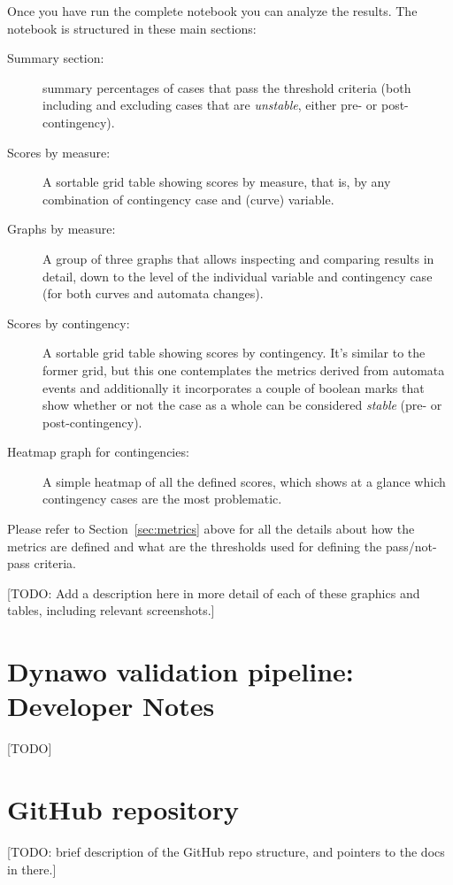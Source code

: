 \documentclass[11pt, a4paper, twoside, titlepage]{article}
\begin{document}
Once you have run the complete notebook you can analyze the
results. The notebook is structured in these main sections:
\begin{description}
\item[Summary section:] summary percentages of cases that pass the
  threshold criteria (both including and excluding cases that are
  \emph{unstable}, either pre- or post-contingency).
\item[Scores by measure:] A sortable grid table showing scores by
  measure, that is, by any combination of contingency case and
  (curve) variable.
\item[Graphs by measure:] A group of three graphs that allows
  inspecting and comparing results in detail, down to the level of the
  individual variable and contingency case (for both curves and
  automata changes).
\item[Scores by contingency:] A sortable grid table showing scores by
  contingency. It's similar to the former grid, but this one
  contemplates the metrics derived from automata events and
  additionally it incorporates a couple of boolean marks that show
  whether or not the case as a whole can be considered \emph{stable}
  (pre- or post-contingency).
\item[Heatmap graph for contingencies:] A simple heatmap of all the
  defined scores, which shows at a glance which contingency cases are
  the most problematic.
\end{description}
Please refer to Section~\ref{sec:metrics} above for all the details
about how the metrics are defined and what are the thresholds used for
defining the pass/not-pass criteria.


[TODO: Add a description here in more detail of each of these graphics
  and tables, including relevant screenshots.]






\section{Dynawo validation pipeline: Developer Notes}
\label{sec:devnotes}
[TODO]







\appendix
\section{GitHub repository}
\label{app:github}
[TODO: brief description of the GitHub repo structure, and pointers to the docs in there.]
      
\end{document}
